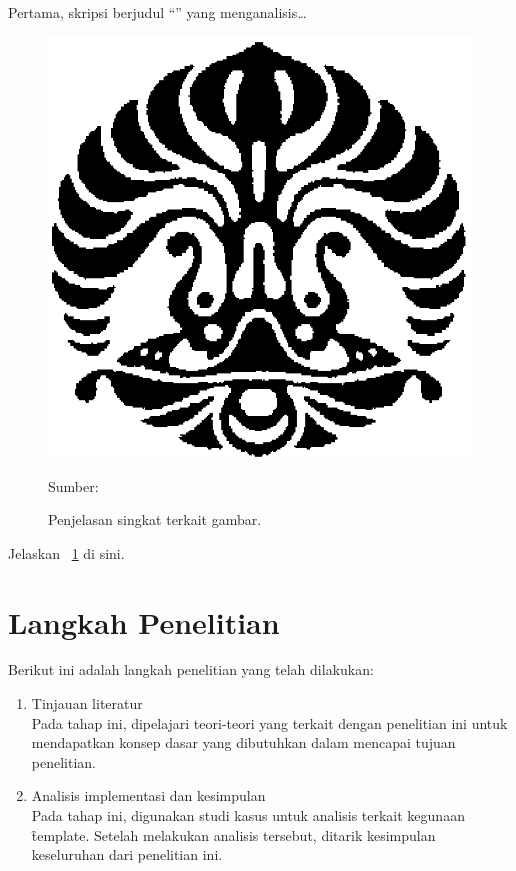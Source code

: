 Pertama, skripsi  \parencite*{Hani2022} berjudul
``'' yang menganalisis\ldots
\lipsum[11]

\begin{figure}
	\centering
	\caption{Penjelasan singkat terkait gambar.}
	\includegraphics[width=\textwidth]{assets/pics/makara.png}\\
	{\footnotesize Sumber: \textcite{Sugiyono2008}\par}
	\label{fig:research_position}
\end{figure}

Jelaskan \pic~\ref{fig:research_position} di sini.


\section{Langkah Penelitian}
Berikut ini adalah langkah penelitian yang telah dilakukan:
\begin{enumerate}
	\item Tinjauan literatur \\
	Pada tahap ini, dipelajari teori-teori yang terkait dengan penelitian ini untuk mendapatkan konsep dasar yang dibutuhkan dalam mencapai tujuan penelitian.
	\item Analisis implementasi dan kesimpulan \\
	Pada tahap ini, digunakan studi kasus untuk analisis terkait kegunaan \f{template}. Setelah melakukan analisis tersebut, ditarik kesimpulan keseluruhan dari penelitian ini.
\end{enumerate}


